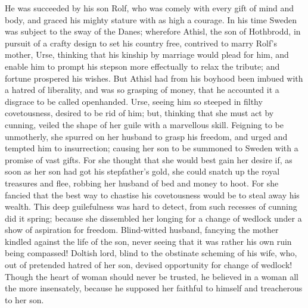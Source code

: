 \documentclass[10pt,a4paper]{report}
\begin{document}
He was succeeded by his son Rolf, who was comely with every gift of mind and body, and graced his mighty stature with as high a courage. In his time Sweden was subject to the sway of the Danes; wherefore Athisl, the son of Hothbrodd, in pursuit of a crafty design to set his country free, contrived to marry Rolf's mother, Urse, thinking that his kinship by marriage would plead for him, and enable him to prompt his stepson more effectually to relax the tribute; and fortune prospered his wishes. But Athisl had from his boyhood been imbued with a hatred of liberality, and was so grasping of money, that he accounted it a disgrace to be called openhanded. Urse, seeing him so steeped in filthy covetousness, desired to be rid of him; but, thinking that she must act by cunning, veiled the shape of her guile with a marvellous skill. Feigning to be unmotherly, she spurred on her husband to grasp his freedom, and urged and tempted him to insurrection; causing her son to be summoned to Sweden with a promise of vast gifts. For she thought that she would best gain her desire if, as soon as her son had got his stepfather's gold, she could snatch up the royal treasures and flee, robbing her husband of bed and money to hoot. For she fancied that the best way to chastise his covetousness would be to steal away his wealth. This deep guilefulness was hard to detect, from such recesses of cunning did it spring; because she dissembled her longing for a change of wedlock under a show of aspiration for freedom. Blind-witted husband, fancying the mother kindled against the life of the son, never seeing that it was rather his own ruin being compassed! Doltish lord, blind to the obstinate scheming of his wife, who, out of pretended hatred of her son, devised opportunity for change of wedlock! Though the heart of woman should never be trusted, he believed in a woman all the more insensately, because he supposed her faithful to himself and treacherous to her son.\\
\end{document}
